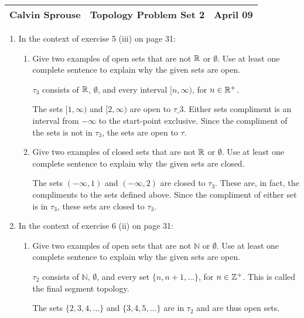 \documentclass[a4paper, 12pt]{config/homework}
\begin{document}
\noindent
\begin{tabularx}{\textwidth}{>{\centering\arraybackslash}X>{\centering\arraybackslash}X>{\centering\arraybackslash}X}
Calvin Sprouse & Topology Problem Set 2 & 2024 April 09\\
\midrule
\end{tabularx}

\vspace{\baselineskip}
\begin{enumerate}
\item In the context of exercise 5 (iii) on page 31:
\begin{enumerate}[label=\alph*.]
\item Give two examples of open sets that are not \(\mathbb{R}\) or \(\emptyset\). Use at least one complete sentence to explain why the given sets are open.

\(\tau_3\) consists of \(\mathbb{R}\), \(\emptyset\), and every interval \([n,\infty)\), for \(n\in\mathbb{R}^+\).

The sets \([1,\infty)\) and \([2,\infty)\) are open to \(\tau\_3\). Either sets compliment is an interval from \(-\infty\) to the start-point exclusive. Since the compliment of the sets is not in \(\tau_3\), the sets are open to \(\tau\).

\item Give two examples of closed sets that are not \(\mathbb{R}\) or \(\emptyset\). Use at least one complete sentence to explain why the given sets are closed.

The sets \((-\infty,1)\) and \((-\infty,2)\) are closed to \(\tau_3\). These are, in fact, the compliments to the sets defined above. Since the compliment of either set is in \(\tau_3\), these sets are closed to \(\tau_3\).

\end{enumerate}
\item In the context of exercise 6 (ii) on page 31:
\begin{enumerate}[label=\alph*.]
\item Give two examples of open sets that are not \(\mathbb{N}\) or \(\emptyset\). Use at least one complete sentence to explain why the given sets are open.

\(\tau_2\) consists of \(\mathbb{N}\), \(\emptyset\), and every set \(\{n, n+1, \dots\}\), for \(n\in\mathbb{Z}^+\). This is called the final segment topology.

The sets \(\{2, 3, 4, \dots\}\) and \(\{3, 4, 5, \dots\}\) are in \(\tau_2\) and are thus open sets.


\end{enumerate}
\end{enumerate}
\end{document}
